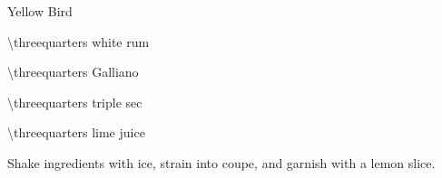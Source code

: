 \begin{Cocktail}{Yellow Bird}
  \begin{Ingredients}
  \item \SI{\threequarters}{\oz} white rum
  \item \SI{\threequarters}{\oz} Galliano
  \item \SI{\threequarters}{\oz} triple sec
  \item \SI{\threequarters}{\oz} lime juice
  \end{Ingredients}
  
  \begin{Instructions}
	Shake ingredients with ice, strain into coupe, and garnish with a lemon
    slice.
  \end{Instructions}
\end{Cocktail}